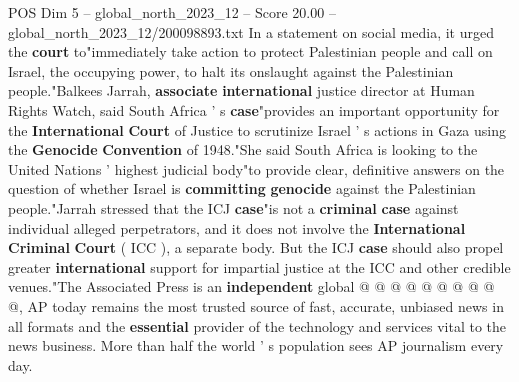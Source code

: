 \begin{textsample}{POS Dim 5 – global\_north\_2023\_12 – Score 20.00 – global\_north\_2023\_12/200098893.txt}
In a statement on social media, it urged the \textbf{court} to"immediately take action to protect Palestinian people and call on Israel, the occupying power, to halt its onslaught against the Palestinian people."Balkees Jarrah, \textbf{associate} \textbf{international} justice director at Human Rights Watch, said South Africa ' s \textbf{case}"provides an important opportunity for the \textbf{International} \textbf{Court} of Justice to scrutinize Israel ' s actions in Gaza using the \textbf{Genocide} \textbf{Convention} of 1948."She said South Africa is looking to the United Nations ' highest judicial body"to provide clear, definitive answers on the question of whether Israel is \textbf{committing} \textbf{genocide} against the Palestinian people."Jarrah stressed that the ICJ \textbf{case}"is not a \textbf{criminal} \textbf{case} against individual alleged perpetrators, and it does not involve the \textbf{International} \textbf{Criminal} \textbf{Court} ( ICC ), a separate body.
But the ICJ \textbf{case} should also propel greater \textbf{international} support for impartial justice at the ICC and other credible venues."The Associated Press is an \textbf{independent} global @ @ @ @ @ @ @ @ @ @, AP today remains the most trusted source of fast, accurate, unbiased news in all formats and the \textbf{essential} provider of the technology and services vital to the news business.
More than half the world ' s population sees AP journalism every day.

\end{textsample}
